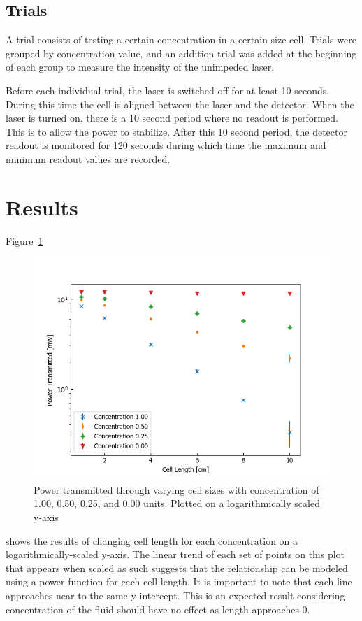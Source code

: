\documentclass[aps,prl,reprint,groupedaddress,amsmath,amssymb,aps]{revtex4-1}
\begin{document}
	\subsection{Trials}
	A trial consists of testing a certain concentration in a certain size cell. Trials were grouped by concentration value, and an addition trial was added at the beginning of each group to measure the intensity of the unimpeded laser.
	
	Before each individual trial, the laser is switched off for at least 10 seconds. During this time the cell is aligned between the laser and the detector. When the laser is turned on, there is a 10 second period where no readout is performed. This is to allow the power to stabilize. After this 10 second period, the detector readout is monitored for 120 seconds during which time the maximum and minimum readout values are recorded.
	
	\section{\label{sec:level1}Results}
	Figure~\ref{trans}
	\begin{figure}
		\includegraphics[width=\columnwidth]{trans.png}
		\caption{\label{trans}Power transmitted through varying cell sizes with concentration of 1.00, 0.50, 0.25, and 0.00 units. Plotted on a logarithmically scaled y-axis}
	\end{figure}
	shows the results of changing cell length for each concentration on a logarithmically-scaled y-axis. The linear trend of each set of points on this plot that appears when scaled as such suggests that the relationship can be modeled using a power function for each cell length. It is important to note that each line approaches near to the same y-intercept. This is an expected result considering concentration of the fluid should have no effect as length approaches $0$.
	
\end{document}
